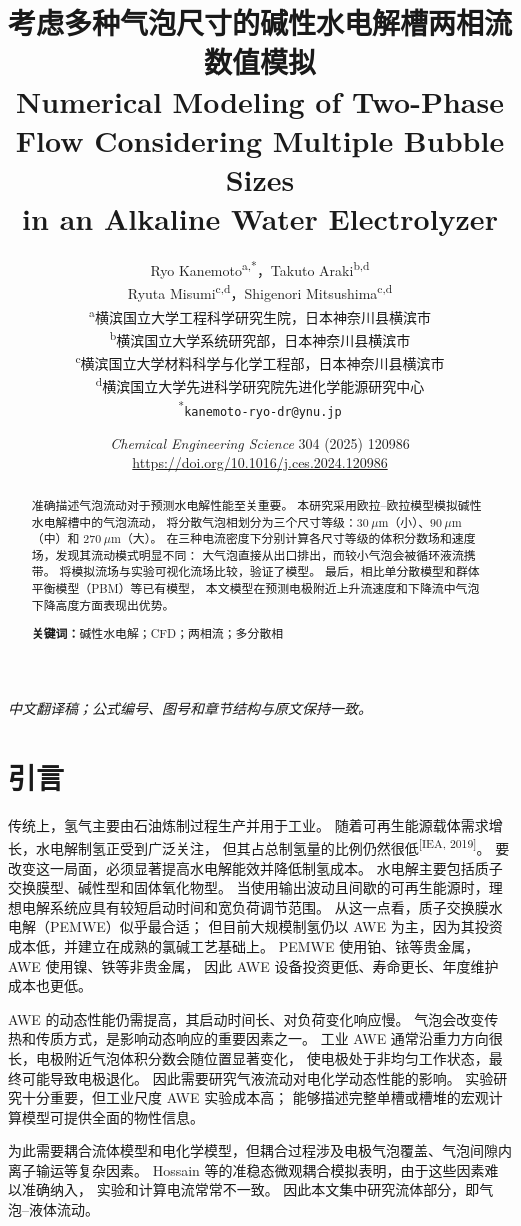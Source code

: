 \documentclass[UTF8,zihao=-4,fontset=fandol]{ctexart}
\title{\bfseries 考虑多种气泡尺寸的碱性水电解槽两相流数值模拟\\
\large Numerical Modeling of Two-Phase Flow Considering Multiple Bubble Sizes\\
in an Alkaline Water Electrolyzer}
\author{Ryo Kanemoto\textsuperscript{a,*}，Takuto Araki\textsuperscript{b,d}\\
Ryuta Misumi\textsuperscript{c,d}，Shigenori Mitsushima\textsuperscript{c,d}\\[0.7em]
\small\textsuperscript{a}横滨国立大学工程科学研究生院，日本神奈川县横滨市\\
\small\textsuperscript{b}横滨国立大学系统研究部，日本神奈川县横滨市\\
\small\textsuperscript{c}横滨国立大学材料科学与化学工程部，日本神奈川县横滨市\\
\small\textsuperscript{d}横滨国立大学先进科学研究院先进化学能源研究中心\\
\small\textsuperscript{*}\texttt{kanemoto-ryo-dr@ynu.jp}}
\date{\small \emph{Chemical Engineering Science} 304 (2025) 120986\\
\url{https://doi.org/10.1016/j.ces.2024.120986}}
\begin{document}
\maketitle
\thispagestyle{empty}
\begin{center}\small\itshape 中文翻译稿；公式编号、图号和章节结构与原文保持一致。\end{center}

\begin{abstract}
准确描述气泡流动对于预测水电解性能至关重要。
本研究采用欧拉--欧拉模型模拟碱性水电解槽中的气泡流动，
将分散气泡相划分为三个尺寸等级：\(30~\mu\mathrm{m}\)（小）、\(90~\mu\mathrm{m}\)（中）和
\(270~\mu\mathrm{m}\)（大）。
在三种电流密度下分别计算各尺寸等级的体积分数场和速度场，发现其流动模式明显不同：
大气泡直接从出口排出，而较小气泡会被循环液流携带。
将模拟流场与实验可视化流场比较，验证了模型。
最后，相比单分散模型和群体平衡模型（PBM）等已有模型，
本文模型在预测电极附近上升流速度和下降流中气泡下降高度方面表现出优势。

\noindent\textbf{关键词：}碱性水电解；CFD；两相流；多分散相
\end{abstract}

\section{引言}

传统上，氢气主要由石油炼制过程生产并用于工业。
随着可再生能源载体需求增长，水电解制氢正受到广泛关注，
但其占总制氢量的比例仍然很低\textsuperscript{[IEA, 2019]}。
要改变这一局面，必须显著提高水电解能效并降低制氢成本。
水电解主要包括质子交换膜型、碱性型和固体氧化物型。
当使用输出波动且间歇的可再生能源时，理想电解系统应具有较短启动时间和宽负荷调节范围。
从这一点看，质子交换膜水电解（PEMWE）似乎最合适；
但目前大规模制氢仍以 AWE 为主，因为其投资成本低，并建立在成熟的氯碱工艺基础上。
PEMWE 使用铂、铱等贵金属，AWE 使用镍、铁等非贵金属，
因此 AWE 设备投资更低、寿命更长、年度维护成本也更低。

AWE 的动态性能仍需提高，其启动时间长、对负荷变化响应慢。
气泡会改变传热和传质方式，是影响动态响应的重要因素之一。
工业 AWE 通常沿重力方向很长，电极附近气泡体积分数会随位置显著变化，
使电极处于非均匀工作状态，最终可能导致电极退化。
因此需要研究气液流动对电化学动态性能的影响。
实验研究十分重要，但工业尺度 AWE 实验成本高；
能够描述完整单槽或槽堆的宏观计算模型可提供全面的物性信息。

为此需要耦合流体模型和电化学模型，但耦合过程涉及电极气泡覆盖、气泡间隙内离子输运等复杂因素。
Hossain 等的准稳态微观耦合模拟表明，由于这些因素难以准确纳入，
实验和计算电流常常不一致。
因此本文集中研究流体部分，即气泡--液体流动。
\end{document}
